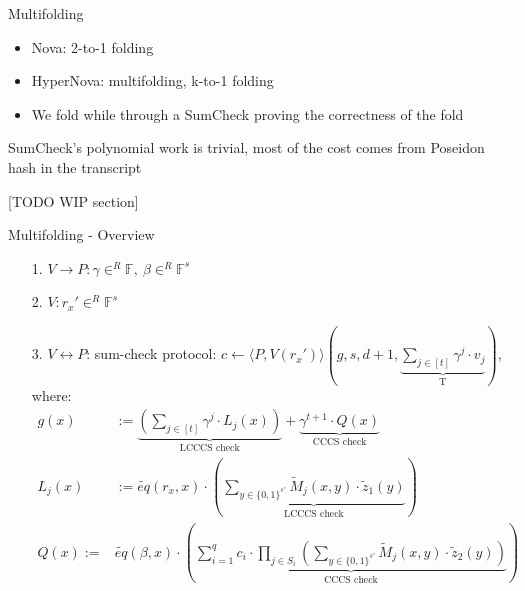 \documentclass{beamer}
\begin{document}
\begin{frame}{Multifolding}
\begin{itemize}
  \item Nova: 2-to-1 folding
  \item HyperNova: multifolding, k-to-1 folding
  \item We fold while through a SumCheck proving the correctness of the fold
\end{itemize}

SumCheck's polynomial work is trivial, most of the cost comes from Poseidon hash in the transcript

[TODO WIP section]

\end{frame}

\begin{frame}{Multifolding - Overview}

  \begin{tiny}
  \begin{enumerate}
    \item[1.] $V \rightarrow P: \gamma \in^R \mathbb{F},~ \beta \in^R \mathbb{F}^s$
    \item[2.] $V: r_x' \in^R \mathbb{F}^s$
    \item[3.] $V \leftrightarrow P$: sum-check protocol:
		  $c \leftarrow \langle P, V(r_x') \rangle (g, s, d+1, \underbrace{\sum_{j \in [t]} \gamma^j \cdot v_j}_\text{T})$, where:
		  \begin{align*}
			  g(x) &:= \underbrace{\left( \sum_{j \in [t]} \gamma^j \cdot L_j(x) \right)}_\text{LCCCS check} + \underbrace{\gamma^{t+1} \cdot Q(x)}_\text{CCCS check}\\
			  L_j(x) &:= \widetilde{eq}(r_x, x) \cdot \left(
				  \underbrace{\sum_{y \in \{0,1\}^{s'}} \widetilde{M}_j(x, y) \cdot \widetilde{z}_1(y)}_\text{LCCCS check}
			  \right)\\
				  Q(x) := &\widetilde{eq}(\beta, x) \cdot \left(
				  \underbrace{ \sum_{i=1}^q c_i \cdot \prod_{j \in S_i} \left( \sum_{y \in \{0, 1\}^{s'}} \widetilde{M}_j(x, y) \cdot \widetilde{z}_2(y) \right) }_\text{CCCS check}
			  \right)
		  \end{align*}
  \end{enumerate}
  \end{tiny}

\end{frame}
\end{document}
